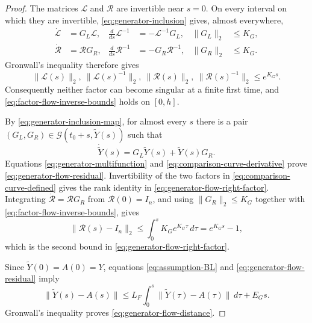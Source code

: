 \documentclass[]{article}
\numberwithin{equation}{section}
\theoremstyle{plain}
\theoremstyle{remark}
\numberwithin{algorithm}{section}
\begin{document}
\begin{proof}
The matrices \(\mathcal L\) and \(\mathcal R\) are invertible near
\(s=0\).  On every interval on which they are invertible,
\eqref{eq:generator-inclusion} gives, almost everywhere,
\begin{align}
 \dot{\mathcal L}&=G_L\mathcal L,
 &\frac{d}{ds}\mathcal L^{-1}&=-\mathcal L^{-1}G_L,
 &\|G_L\|_2&\le K_G,                                \label{eq:left-factor-inverse-flow}\\
 \dot{\mathcal R}&=\mathcal R G_R,
 &\frac{d}{ds}\mathcal R^{-1}&=-G_R\mathcal R^{-1},
 &\|G_R\|_2&\le K_G.                                \label{eq:right-factor-inverse-flow}
\end{align}
Gronwall's inequality therefore gives
\begin{equation}\label{eq:factor-flow-inverse-bounds}
 \|\mathcal L(s)\|_2,\ \|\mathcal L(s)^{-1}\|_2,
 \ \|\mathcal R(s)\|_2,\ \|\mathcal R(s)^{-1}\|_2
 \le e^{K_Gs}.
\end{equation}
Consequently neither factor can become singular at a finite first time,
and \eqref{eq:factor-flow-inverse-bounds} holds on \([0,h]\).

By \eqref{eq:generator-inclusion-map}, for almost every \(s\) there is a
pair \((G_L,G_R)\in\mathcal G(t_0+s,\widetilde Y(s))\) such that
\begin{equation}\label{eq:comparison-curve-derivative}
 \dot{\widetilde Y}(s)
 =G_L\widetilde Y(s)+\widetilde Y(s)G_R.
\end{equation}
Equations \eqref{eq:generator-multifunction} and
\eqref{eq:comparison-curve-derivative} prove
\eqref{eq:generator-flow-residual}.  Invertibility of the two factors in
\eqref{eq:comparison-curve-defined} gives the rank identity in
\eqref{eq:generator-flow-right-factor}.  Integrating
\(\dot{\mathcal R}=\mathcal R G_R\) from \(\mathcal R(0)=I_n\), and using
\(\|G_R\|_2\le K_G\) together with
\eqref{eq:factor-flow-inverse-bounds}, gives
\[
 \|\mathcal R(s)-I_n\|_2
 \le\int_0^sK_Ge^{K_G\tau}\,d\tau
 =e^{K_Gs}-1,
\]
which is the second bound in \eqref{eq:generator-flow-right-factor}.

Since \(\widetilde Y(0)=A(0)=Y\), equations
\eqref{eq:assumption-BL} and \eqref{eq:generator-flow-residual} imply
\begin{equation}\label{eq:comparison-distance-integral}
 \|\widetilde Y(s)-A(s)\|
 \le L_F\int_0^s\|\widetilde Y(\tau)-A(\tau)\|\,d\tau+E_Gs.
\end{equation}
Gronwall's inequality proves \eqref{eq:generator-flow-distance}.
\end{proof}
\end{document}

